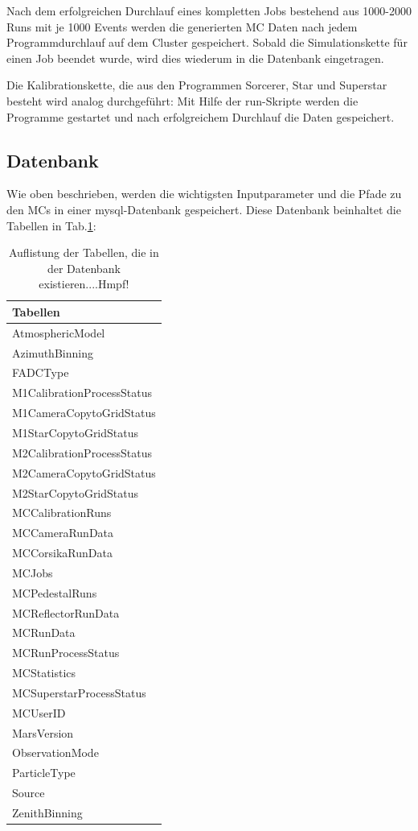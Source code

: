 Nach dem erfolgreichen Durchlauf eines kompletten Jobs  bestehend aus 1000-2000 Runs mit je 1000 Events werden die generierten MC Daten nach jedem Programmdurchlauf auf dem Cluster gespeichert.
Sobald die Simulationskette für einen Job beendet wurde, wird dies wiederum in die Datenbank eingetragen.

Die Kalibrationskette, die aus den Programmen Sorcerer, Star und Superstar besteht wird analog durchgeführt:
Mit Hilfe der run-Skripte werden die Programme gestartet und nach erfolgreichem Durchlauf die Daten gespeichert.

\subsection{Datenbank}
Wie oben beschrieben, werden die wichtigsten Inputparameter und die Pfade zu den MCs in einer mysql-Datenbank gespeichert.
Diese Datenbank beinhaltet die Tabellen in Tab.\ref{MYSQL_Tabellen}:

\begin{table}[!h]
\centering
\caption{Auflistung der Tabellen, die in der Datenbank existieren....Hmpf!}
\label{MYSQL_Tabellen}
\begin{tabular}{l}
  \toprule
  Tabellen\\
  \midrule
  AtmosphericModel           \\
  AzimuthBinning             \\
  FADCType                   \\
  M1CalibrationProcessStatus \\
  M1CameraCopytoGridStatus   \\
  M1StarCopytoGridStatus     \\
  M2CalibrationProcessStatus \\
  M2CameraCopytoGridStatus   \\
  M2StarCopytoGridStatus     \\
  MCCalibrationRuns          \\
  MCCameraRunData            \\
  MCCorsikaRunData           \\
  MCJobs                     \\
  MCPedestalRuns             \\
  MCReflectorRunData         \\
  MCRunData                  \\
  MCRunProcessStatus         \\
  MCStatistics               \\
  MCSuperstarProcessStatus   \\
  MCUserID                   \\
  MarsVersion                \\
  ObservationMode            \\
  ParticleType               \\
  Source                     \\
  ZenithBinning   	     \\
  \bottomrule
\end{tabular}
\end{table}

